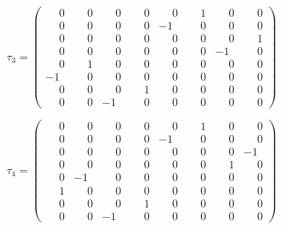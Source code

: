 \documentclass[10pt]{article}
\begin{document}
\[
\tau_{3} = \left(\begin{smallmatrix}
\phantom{-}0 & \phantom{-}0 & \phantom{-}0 & \phantom{-}0 & \phantom{-}0 & \phantom{-}1 & \phantom{-}0 & \phantom{-}0 \\
\phantom{-}0 & \phantom{-}0 & \phantom{-}0 & \phantom{-}0 & -1 & \phantom{-}0 & \phantom{-}0 & \phantom{-}0 \\
\phantom{-}0 & \phantom{-}0 & \phantom{-}0 & \phantom{-}0 & \phantom{-}0 & \phantom{-}0 & \phantom{-}0 & \phantom{-}1 \\
\phantom{-}0 & \phantom{-}0 & \phantom{-}0 & \phantom{-}0 & \phantom{-}0 & \phantom{-}0 & -1 & \phantom{-}0 \\
\phantom{-}0 & \phantom{-}1 & \phantom{-}0 & \phantom{-}0 & \phantom{-}0 & \phantom{-}0 & \phantom{-}0 & \phantom{-}0 \\
-1 & \phantom{-}0 & \phantom{-}0 & \phantom{-}0 & \phantom{-}0 & \phantom{-}0 & \phantom{-}0 & \phantom{-}0 \\
\phantom{-}0 & \phantom{-}0 & \phantom{-}0 & \phantom{-}1 & \phantom{-}0 & \phantom{-}0 & \phantom{-}0 & \phantom{-}0 \\
\phantom{-}0 & \phantom{-}0 & -1 & \phantom{-}0 & \phantom{-}0 & \phantom{-}0 & \phantom{-}0 & \phantom{-}0
\end{smallmatrix}\right)
\]

\[
\tau_{4} = \left(\begin{smallmatrix}
\phantom{-}0 & \phantom{-}0 & \phantom{-}0 & \phantom{-}0 & \phantom{-}0 & \phantom{-}1 & \phantom{-}0 & \phantom{-}0 \\
\phantom{-}0 & \phantom{-}0 & \phantom{-}0 & \phantom{-}0 & -1 & \phantom{-}0 & \phantom{-}0 & \phantom{-}0 \\
\phantom{-}0 & \phantom{-}0 & \phantom{-}0 & \phantom{-}0 & \phantom{-}0 & \phantom{-}0 & \phantom{-}0 & -1 \\
\phantom{-}0 & \phantom{-}0 & \phantom{-}0 & \phantom{-}0 & \phantom{-}0 & \phantom{-}0 & \phantom{-}1 & \phantom{-}0 \\
\phantom{-}0 & -1 & \phantom{-}0 & \phantom{-}0 & \phantom{-}0 & \phantom{-}0 & \phantom{-}0 & \phantom{-}0 \\
\phantom{-}1 & \phantom{-}0 & \phantom{-}0 & \phantom{-}0 & \phantom{-}0 & \phantom{-}0 & \phantom{-}0 & \phantom{-}0 \\
\phantom{-}0 & \phantom{-}0 & \phantom{-}0 & \phantom{-}1 & \phantom{-}0 & \phantom{-}0 & \phantom{-}0 & \phantom{-}0 \\
\phantom{-}0 & \phantom{-}0 & -1 & \phantom{-}0 & \phantom{-}0 & \phantom{-}0 & \phantom{-}0 & \phantom{-}0
\end{smallmatrix}\right)
\]
\end{document}
